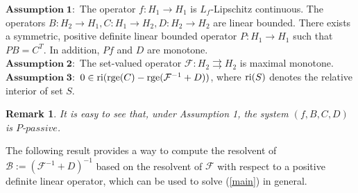 \documentclass[11pt]{article}
\theoremstyle{plain}
\newtheorem{remark}{Remark}
\begin{document}
{\noindent$\mathbf{Assumption \;1}:$ The operator $ f: H_1 \to H_1$ is $L_f$-Lipschitz continuous. The operators $B: H_2 \to H_1, C: H_1 \to H_2, D: H_2 \to H_2$ are linear bounded.  There exists a symmetric, positive definite linear bounded operator $P: H_1 \to H_1$ such that $PB=C^T$. In addition, $Pf$ and $D$ are monotone.\\

%

\noindent$\mathbf{Assumption \;2}:$ The set-valued operator $\mathcal{F}: H_2 \rightrightarrows H_2$ is maximal monotone. \\

\noindent$\mathbf{Assumption \;3}:$   $0\in {\rm ri}({\rm rge}({C})-{\rm rge}({\mathcal{F}}^{-1}+D))$, where ${\rm ri}(S)$ denotes the relative interior of set $S$.
\begin{remark}
 It is easy to see that, under Assumption 1, the system $(f,B,C,D)$ is  $P$-$passive$. 
\end{remark}

%

The following result provides a way to compute the resolvent of $\mathcal{B}:=(\mathcal{F}^{-1}+D)^{-1}$ based on the resolvent  of $\mathcal{F}$ with respect to a positive definite linear operator, which can be used to  solve (\ref{main}) in general.

}
\end{document}
